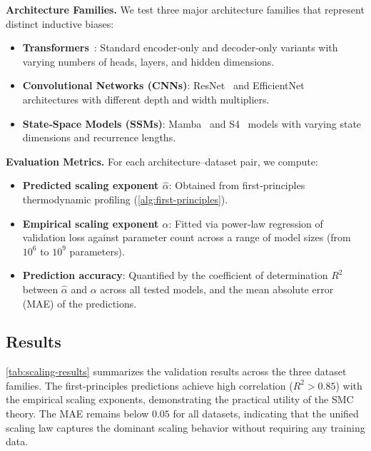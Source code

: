 \documentclass[11pt, a4paper]{article}
\theoremstyle{definition}
\begin{document}
\textbf{Architecture Families.} We test three major architecture families that represent distinct inductive biases:
\begin{itemize}
    \item \textbf{Transformers}~\cite{vaswani2017attention}: Standard encoder‑only and decoder‑only variants with varying numbers of heads, layers, and hidden dimensions.
    \item \textbf{Convolutional Networks (CNNs)}: ResNet~\cite{he2016deep} and EfficientNet~\cite{tan2019efficientnet} architectures with different depth and width multipliers.
    \item \textbf{State‑Space Models (SSMs)}: Mamba~\cite{gu2023mamba} and S4~\cite{gu2022parameterization} models with varying state dimensions and recurrence lengths.
\end{itemize}

\textbf{Evaluation Metrics.} For each architecture--dataset pair, we compute:
\begin{itemize}
    \item \textbf{Predicted scaling exponent $\hat{\alpha}$}: Obtained from first‑principles thermodynamic profiling (\cref{alg:first-principles}).
    \item \textbf{Empirical scaling exponent $\alpha$}: Fitted via power‑law regression of validation loss against parameter count across a range of model sizes (from $10^6$ to $10^9$ parameters).
    \item \textbf{Prediction accuracy}: Quantified by the coefficient of determination $R^2$ between $\hat{\alpha}$ and $\alpha$ across all tested models, and the mean absolute error (MAE) of the predictions.
\end{itemize}

\subsection{Results}
\label{subsec:results}
\cref{tab:scaling-results} summarizes the validation results across the three dataset families. The first‑principles predictions achieve high correlation ($R^2 > 0.85$) with the empirical scaling exponents, demonstrating the practical utility of the SMC theory. The MAE remains below $0.05$ for all datasets, indicating that the unified scaling law captures the dominant scaling behavior without requiring any training data.
\end{document}
